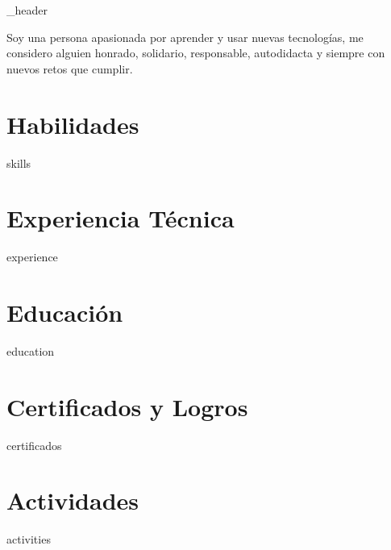 \documentclass[letter,10pt]{article}
\author{Joseph Mottoccanche} %
\begin{document}
{_header}

Soy una persona apasionada por aprender y usar nuevas tecnologías, me considero alguien
honrado, solidario, responsable, autodidacta y siempre con nuevos retos que cumplir.


\section{Habilidades}
{skills}

\section{Experiencia Técnica}
{experience}

\section{Educación}
{education}

\section{Certificados y Logros}
{certificados}

\section{Actividades}
{activities}
\end{document}
